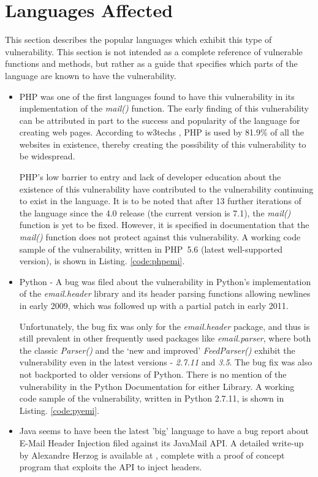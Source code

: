 \section{Languages Affected}

This section describes the popular languages which exhibit this type of vulnerability. This section is not intended as a complete reference of vulnerable functions and methods, but rather as a guide that specifies which parts of the language are known to have the vulnerability.
\begin{itemize}
	\item PHP was one of the first languages found to have this vulnerability in its implementation of the \emph{mail()} function. The early finding of this vulnerability can be attributed in part to the success and popularity of the language for creating web pages. According to w3techs \cite{W3techs}, PHP is used by 81.9\% of all the websites in existence, thereby creating the possibility of this vulnerability to be widespread. 
	
	PHP's low barrier to entry and lack of developer education about the existence of this vulnerability have contributed to the vulnerability continuing to exist in the language.
	It is to be noted that after 13 further iterations of the language since the 4.0 release (the current version is 7.1), the \emph{mail()} function is yet to be fixed. However, it is specified in documentation \cite{PHPDocs} that the \emph{mail()} function does not protect against this vulnerability.
	A working code sample of the vulnerability, written in PHP~5.6 (latest well-supported version), is shown in  Listing. \ref{code:phpemi}.
	
	
	\item Python - A bug was filed about the vulnerability in Python's implementation of the \emph{email.header} library and its header parsing functions allowing newlines in early 2009, which was followed up with a partial patch in early 2011. 
	
	Unfortunately, the bug fix was only for the \emph{email.header} package, and thus is still prevalent in other frequently used packages like \emph{email.parser}, where both the classic \emph{Parser()} and the `new and improved' \emph{FeedParser()} exhibit the vulnerability even in the latest versions - \emph{2.7.11} and \emph{3.5}. The bug fix was also not backported to older versions of Python. 
	There is no mention of the vulnerability in the Python Documentation for either Library.
	A working code sample of the vulnerability, written in Python 2.7.11, is shown in Listing. \ref{code:pyemi}.
	
	\item Java seems to have been the latest 'big' language to have a bug report about E-Mail Header Injection filed against its JavaMail API. A detailed write-up by Alexandre Herzog is available at \cite{Herzog.2014}, complete with a proof of concept program that exploits the API to inject headers.
	

\end{itemize}

